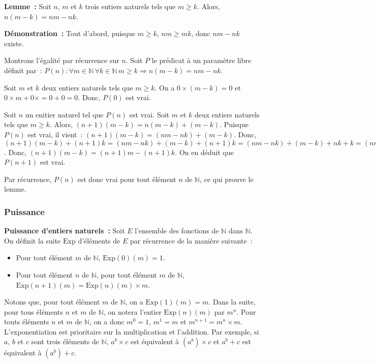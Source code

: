 \medskip

\noindent\textbf{Lemme :} Soit $n$, $m$ et $k$ trois entiers naturels tels que $m \geq k$.
    Alors, $n (m - k) = n m - n k$.

\medskip

\noindent\textbf{Démonstration :} 
    Tout d'abord, puisque $m \geq k$, $n m \geq m k$, donc $n m - n k$ existe.

    Montrons l'égalité par récurrence sur $n$. 
    Soit $P$ le prédicat à un paramètre libre définit par : $P(n): \forall m \in \mathbb{N} \, \forall k \in \mathbb{N} \, m \geq k \Rightarrow n (m-k) = n m - n k$. 
    
    Soit $m$ et $k$ deux entiers naturels tels que $m \geq k$.
    On a $0 \times (m-k) = 0$ et $0 \times m + 0 \times = 0 + 0 = 0$.
    Donc, $P(0)$ est vrai.

    Soit $n$ un enitier naturel tel que $P(n)$ est vrai. 
    Soit $m$ et $k$ deux entiers naturels tels que $m \geq k$. 
    Alors, $(n+1) (m-k) = n (m-k) + (m-k)$. 
    Puisque $P(n)$ est vrai, il vient : $(n+1)(m-k) = (n m - n k) + (m-k)$.
    Donc, $(n+1)(m-k) + (n+1) k = (n m - n k) + (m-k) + (n+1) k = (n m - n k) + (m-k) + n k + k = (n m - n k) + n k + (m-k) + k = n m + m = (n+1) m$.
    Donc, $(n+1)(m-k) = (n+1)m - (n+1) k$.
    On en déduit que $P(n+1)$ est vrai. 

    Par récurrence, $P(n)$ est donc vrai pour tout élément $n$ de $\mathbb{N}$, ce qui prouve le lemme.

    \done

\subsubsection{Puissance}
\label{subsub:puissance}

\noindent\textbf{Puissance d'entiers naturels :} Soit $E$ l'ensemble des fonctions de $\mathbb{N}$ dans $\mathbb{N}$. 
    On définit la suite $\mathrm{Exp}$ d'éléments de $E$ par récurrence de la manière suivante : 
    \begin{itemize}[nosep]
        \item Pour tout élément $m$ de $\mathbb{N}$, $\mathrm{Exp}(0)(m) = 1$.
        \item Pour tout élément $n$ de $\mathbb{N}$, pour tout élément $m$ de $\mathbb{N}$, $\mathrm{Exp}(n+1)(m) = \mathrm{Exp}(n)(m) \times m$.
    \end{itemize}
    Notons que, pour tout élément $m$ de $\mathbb{N}$, on a $\mathrm{Exp}(1)(m) = m$. 
    Dans la suite, pour tous éléments $n$ et $m$ de $\mathbb{N}$, on notera l'entier $\mathrm{Exp}(n)(m)$ par $m^n$. 
    Pour touts éléments $n$ et $m$ de $\mathbb{N}$, on a donc $m^0=1$, $m^1 = m$ et $m^{n+1} = m^n \times m$. 
    L'exponentiation est prioritaire sur la multiplication et l'addition. 
    Par exemple, si $a$, $b$ et $c$ sont trois éléments de $\mathbb{N}$, $a^b \times c$ est équivalent à $(a^b) \times c$ et $a^b + c$ est équivalent à $(a^b) + c$.

